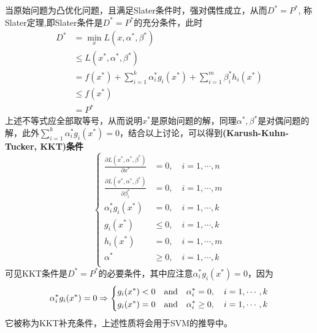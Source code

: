 \documentclass[supercite]{upcthesis}
\begin{document}
当原始问题为凸优化问题，且满足Slater条件时，强对偶性成立，从而$D^{*}=P^{*}$, 称Slater定理,即Slater条件是$D^{*}=P^{*}$的充分条件，此时
\begin{equation}
\begin{aligned}
D^{*}&=\min\limits_{x}L(x,\alpha^{*},\beta^{*})\\
& \leq L(x^{*},\alpha^{*},\beta^{*})\\
& =f(x^{*})+\sum_{i=1}^{k}\alpha_{i}^{*}g_{i}(x^{*})+\sum_{i=1}^{m}\beta_{i}^{*}h_{i}(x^{*})\\
& \leq f(x^{*})\\
& =P^{*}
\end{aligned}
\end{equation}
上述不等式应全部取等号，从而说明$x^{*}$是原始问题的解，同理$\alpha^{*},\beta^{*}$是对偶问题的解，此外$\sum_{i=1}^{k}\alpha_{i}^{*}g_{i}(x^{*})=0$，结合以上讨论，可以得到\textbf{(Karush-Kuhn-Tucker, KKT)条件}
\begin{equation}
\left\{
\begin{array}{rl}
\frac{\partial L(x^{*},\alpha^{*},\beta^{*})}{\partial x^{*}}&=0,\quad i=1,\cdots,n \\
\frac{\partial L(x^{*},\alpha^{*},\beta^{*})}{\partial \beta_{i}^{*}}&=0,\quad i=1,\cdots,m \\
\alpha_{i}^{*}g_{i}(x^{*})&=0,\quad i=1,\cdots,k \\
g_{i}(x^{*}) & \leq 0,\quad i=1,\cdots,k \\
h_{i}(x^{*}) & = 0,\quad i=1,\cdots,m \\
\alpha^{*} & \geq 0,\quad i=1,\cdots,k \\
\end{array}
\right.
\end{equation}
可见KKT条件是$D^{*}=P^{*}$的必要条件，其中应注意$\alpha_{i}^{*}g_{i}(x^{*})=0$，因为
\begin{equation}
\alpha_{i}^{*}g_{i}(x^{*})=0 \Rightarrow \begin{dcases}
g_i(x^{*}) < 0\quad \text{and}\quad \alpha_i^{*}=0,\quad i=1,\cdots,k\\
g_i(x^{*}) =0 \quad \text{and} \quad \alpha_i^{*} \geq 0,\quad i=1,\cdots,k\\
\end{dcases}
\end{equation}
它被称为KKT补充条件，上述性质将会用于SVM的推导中。
\end{document}
